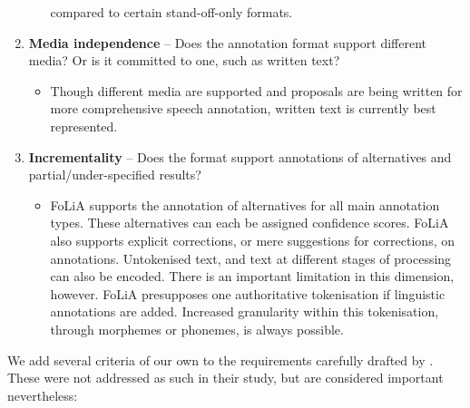 \documentclass[a4paper,10pt,twoside]{article}
\begin{document}
\begin{enumerate}
\begin{itemize}
      compared to certain stand-off-only formats. 
  \end{itemize}
\item \textbf{Media independence} -- Does the annotation format support
  different media? Or is it committed to one, such as written text?
  \begin{itemize}
    \item[] Though different media are supported and proposals are being written
      for more comprehensive speech annotation, written text is currently best
      represented. 
   \end{itemize}
\item \textbf{Incrementality} -- Does the format support annotations of
  alternatives and partial/under-specified results? 
   \begin{itemize} 
     \item[] FoLiA supports the annotation of alternatives for all
    main annotation types. These alternatives can each be assigned confidence
    scores. FoLiA also supports explicit corrections, or mere suggestions for
    corrections, on annotations.
    Untokenised text, and text at different stages of processing can also be
    encoded. There is an important limitation in this dimension, however. FoLiA
    presupposes one authoritative tokenisation if linguistic annotations are
    added. Increased granularity within this tokenisation, through morphemes or
    phonemes, is always possible.
  \end{itemize}
   \setcounter{enumTemp}{\theenumi}
\end{enumerate}

We add several criteria of our own to the requirements carefully drafted by
. These were not addressed as such in their study, but are
considered important nevertheless:
\end{document}

